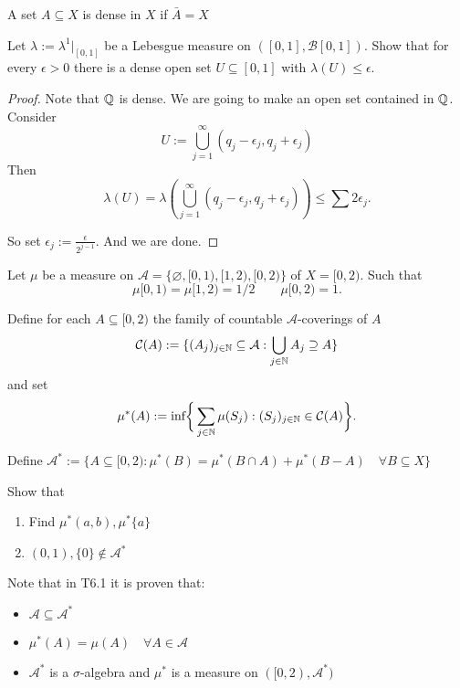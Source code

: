 \begin{defn}
A set \(A\subseteq X\) is dense in \(X\) if \(\bar{A}=X\)
\end{defn}

\begin{thm}[Problem 6.7]
Let \(\lambda :=\lambda ^1|_{[0,1]}\) be a Lebesgue measure on \(([0,1], \mathcal{B}[0,1])\). Show that for every \(\epsilon>0\) there is a dense open set \(U\subseteq [0,1]\) with \(\lambda (U)\leq \epsilon\).
\end{thm}

\begin{proof}
Note that \(\Bbb{Q}\) is dense. We are going to make an open set contained in \(\Bbb{Q}\).
Consider
\[
U:=\bigcup _{j=1}^\infty (q_{j}-\epsilon_{j},q_{j}+\epsilon_{j})
\]
Then
\[
\lambda (U)=\lambda (\bigcup _{j=1}^\infty (q_{j}-\epsilon_{j},q_{j}+\epsilon_{j}))\leq \sum 2\epsilon_{j}.
\]

So set \(\epsilon_{j}:=\frac{\epsilon}{2^{j-1}}\). And we are done.
\end{proof}

\begin{thm}[Problem 6.10i]
Let \(\mu \) be a measure on \(\mathcal{A}=\{\varnothing ,[0,1),[1,2),[0,2)\}\) of $X=[0,2)$. Such that
\[
\mu [0,1)=\mu [1,2)=1/2 \qquad \mu [0,2)=1.
\]

Define for each \(A\subseteq [0,2)\) the family of countable \(\mathcal{A}\)-coverings of \(A\)
\[
\mathcal{C}(A):=\{(A_{j})_{j\in \Bbb{N}}\subseteq \mathcal{A} : \bigcup _{j\in \Bbb{N}}A_{j} \supseteq A\}
\]
and set
\[
\mu ^*(A):=\text{inf}\bigg\{\sum _{j\in \Bbb{N}}\mu (S_{j}) : (S_{j})_{j\in \Bbb{N}}\in \mathcal{C}(A)\bigg\}.
\]

Define \(\mathcal{A}^*:=\{A\subseteq [0,2): \mu ^*(B)=\mu ^*(B\cap A)+\mu ^*(B-A) \quad \forall B\subseteq X \}\)

Show that

\begin{enumerate}
  \item Find \(\mu ^*(a,b),\mu ^*\{a\}\)
  \item \((0,1),\{0\}\not\in \mathcal{A}^*\)
\end{enumerate}

\end{thm}

Note that in T6.1 it is proven that:

\begin{itemize}
  \item \(\mathcal{A}\subseteq \mathcal{A}^*\)
  \item \(\mu ^*(A)=\mu (A)  \quad \forall A\in \mathcal{A}\)
  \item \(\mathcal{A}^*\) is a \(\sigma \)-algebra and \(\mu ^*\) is a measure on \(([0,2),\mathcal{A}^*)\)
\end{itemize}

